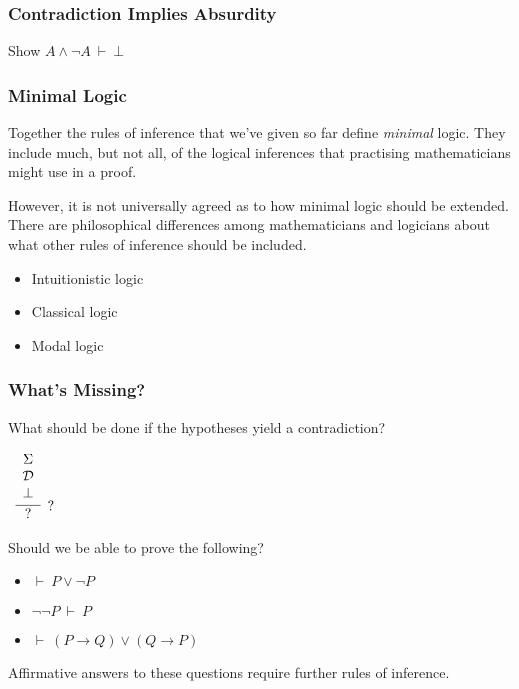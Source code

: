 \documentclass{beamer}
\begin{document}
\begin{frame}
	\frametitle{Contradiction Implies Absurdity}
	
	Show $A \land \lnot A \ \vdash \ \bot$
	
	\vspace{70mm}
	
\end{frame}

\begin{frame}
	\frametitle{Minimal Logic}
	
	Together the rules of inference that we've given so far define \emph{minimal} logic. They include much, but not all, of the logical inferences that practising mathematicians might use in a proof. 
	
	\vspace{5mm}
	
	However, it is not universally agreed as to how minimal logic should be extended. There are philosophical differences among mathematicians and logicians about what other rules of inference should be included. 
	
	\begin{itemize}
		\item Intuitionistic logic
		\item Classical logic 
		\item Modal logic		
	\end{itemize}	
\end{frame}

\begin{frame}
  \frametitle{What's Missing?}

	What should be done if the hypotheses yield a contradiction? 

	\begin{center}
		$\begin{array}{c}
		\infer[?]{?}{\begin{array}{c} \Sigma \\ \mathcal{D} \\ \bot \end{array}}
		\end{array}$
	\end{center}

	Should we be able to prove the following? 
	\begin{itemize}
		\item[] $\vdash \ P \lor \lnot P$
		\item[] $\lnot \lnot P \ \vdash \ P$
		\item[] $\vdash \ (P \to Q) \lor (Q \to P)$
	\end{itemize}

	Affirmative answers to these questions require further rules of inference. 

\end{frame}
\end{document}
